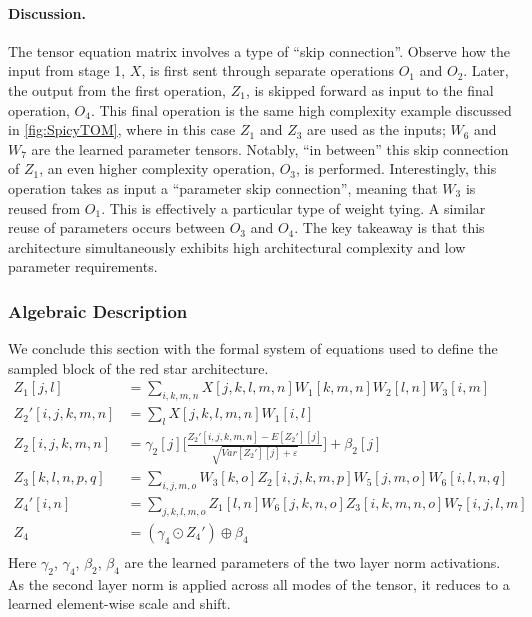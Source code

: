 \documentclass{article}
\theoremstyle{plain}
\theoremstyle{definition}
\theoremstyle{remark}
\let\oldparagraph\paragraph
\renewcommand{\paragraph}[1]{%
	\vspace{-0.5em}%
	\oldparagraph{#1}%
}
\begin{document}
\paragraph{Discussion.}
The tensor equation matrix involves a type of ``skip connection''. Observe how the input from stage 1, $X$, is first sent through separate operations $O_1$ and $O_2$. Later, the output from the first operation, $Z_1$, is skipped forward as input to the final operation, $O_4$. This final operation is the same high complexity example discussed in \cref{fig:SpicyTOM}, where in this case $Z_1$ and $Z_3$ are used as the inputs; $W_6$ and $W_7$ are the learned parameter tensors. Notably, ``in between'' this skip connection of $Z_1$, an even higher complexity operation, $O_3$, is performed. Interestingly, this operation takes as input a ``parameter skip connection'', meaning that $W_3$ is reused from $O_1$. This is effectively a particular type of weight tying. A similar reuse of parameters occurs between $O_3$ and $O_4$. The key takeaway is that this architecture simultaneously exhibits high architectural complexity and low parameter requirements.

\subsubsection{\label{sec:RedStarArch_Alg}Algebraic Description}
We conclude this section with the formal system of equations used to define the sampled block of the red star architecture.
\begin{equation*}
	\begin{aligned}
		Z_1[j,l] &= \sum_{i,k,m,n} X[j,k,l,m,n]W_1[k,m,n]W_2[l,n]W_3[i,m]\\
		Z_2'[i,j,k,m,n] &= \sum_{l} X[j,k,l,m,n]W_1[i,l]\\
		Z_2[i,j,k,m,n] &= \gamma_2[j] \bigg[ \frac{Z_2'[i,j,k,m,n] - E[Z_2'][j]}{\sqrt{Var[Z_2'][j] + \varepsilon}} \bigg] + \beta_2[j]\\
		Z_3[k,l,n,p,q] &= \sum_{i,j,m,o} W_3[k,o]Z_2[i,j,k,m,p]W_5[j,m,o]W_6[i,l,n,q]\\
		Z_4'[i,n] &= \sum_{j,k,l,m,o} Z_1[l,n]W_6[j,k,n,o]Z_3[i,k,m,n,o]W_7[i,j,l,m]\\
		Z_4 &= (\gamma_4 \odot Z_4') \oplus \beta_4\\
	\end{aligned}
\end{equation*}
Here $\gamma_2$, $\gamma_4$, $\beta_2$, $\beta_4$ are the learned parameters of the two layer norm activations. As the second layer norm is applied across all modes of the tensor, it reduces to a learned element-wise scale and shift.

%
\end{document}
